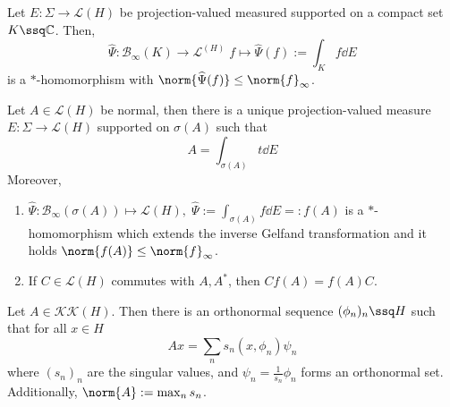 \begin{thm}
  Let $E:\Sigma \to \mathcal{L}(H)$ be projection-valued measured supported on a compact set $K\ssq \mathbb{C}$. Then, 
  $$\widehat{\Psi}: \mathcal{B}_\infty(K) \to \mathcal{L}^(H)\; f \mapsto \widehat{\Psi}(f):= \int_{K}^{} f \dd{E} $$
  is a $*$-homomorphism with $\norm{\widehat{\Psi}(f)} \leq \norm{f}_\infty$.
  \begin{description}
    \item Let $A\in \mathcal{L}(H)$ be normal, then there is a unique projection-valued measure $E:\Sigma \to \mathcal{L}(H)$ supported on $\sigma(A)$ such that $$A= \int_{\sigma(A)}^{} t \dd{E} $$ Moreover, 
      \begin{enumerate}
        \item $\widehat{\Psi}: \mathcal{B}_\infty(\sigma(A))\mapsto \mathcal{L}(H), \; \widehat{\Psi}:= \int_{\sigma(A)}^{} f \dd{E}=:f(A) $ is a $*$-homomorphism which extends the inverse Gelfand transformation and it holds $\norm{f(A)} \leq \norm{f}_\infty$. 
        \item If $C\in \mathcal{L}(H)$ commutes with $A, A^*$, then $Cf(A) = f(A)C$.
      \end{enumerate}
  \end{description}
\end{thm}


\begin{thm}
    
\end{thm}


\begin{defn}
    
\end{defn}


\begin{thm}
  Let $A\in \mathcal{KK}(H)$. Then there is an orthonormal sequence $(\phi_n)_n\ssq H$ such that for all $x\in H$ \[ Ax = \sum_n s_n (x,\phi_n) \psi_n\]
  where $(s_n)_n$ are the singular values, and $\psi_n=\frac{1}{s_n}\phi_n$ forms an orthonormal set. Additionally, $\norm{A}:= \max_n s_n$.
\end{thm}
